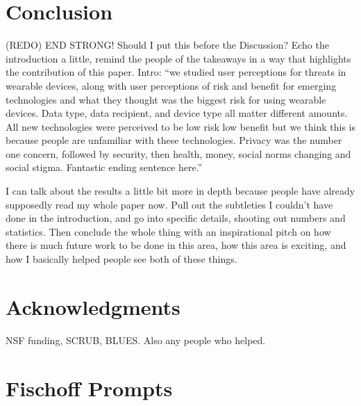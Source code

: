 \documentclass{acm_proc_article-sp}
\begin{document}

\section{Conclusion}
(REDO) END STRONG! Should I put this before the Discussion?  Echo the introduction a little, remind the people of the takeaways in a way that highlights the contribution of this paper. Intro: ``we studied user perceptions for threats in wearable devices, along with user perceptions of risk and benefit for emerging technologies and what they thought was the biggest risk for using wearable devices. Data type, data recipient, and device type all matter different amounts. All new technologies were perceived to be low risk low benefit but we think this is because people are unfamiliar with these technologies. Privacy was the number one concern, followed by security, then health, money, social norms changing and social stigma. Fantastic ending sentence here.''

I can talk about the results a little bit more in depth because people have already supposedly read my whole paper now. Pull out the subtleties I couldn't have done in the introduction, and go into specific details, shooting out numbers and statistics. Then conclude the whole thing with an inspirational pitch on how there is much future work to be done in this area, how this area is exciting, and how I basically helped people see both of these things. 


\section{Acknowledgments}
NSF funding, SCRUB, BLUES. Also any people who helped.







\appendix
\section{Fischoff Prompts}
\label{sec:prompt}
\end{document}

